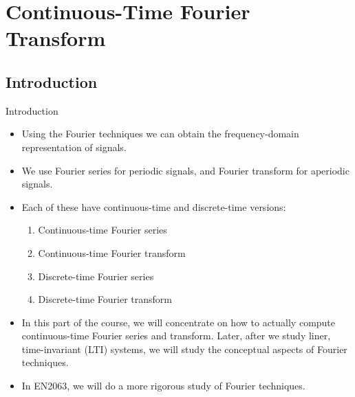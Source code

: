 \section{Continuous-Time Fourier Transform}

\subsection{Introduction}
\begin{frame}{Introduction}
    \begin{itemize}[<+->]
      \item Using the Fourier techniques we can obtain the frequency-domain representation of signals.
      \item We use Fourier series for periodic signals, and Fourier transform for aperiodic signals.
      \item Each of these have continuous-time and discrete-time versions:
        \begin{enumerate}
            \item Continuous-time Fourier series
            \item Continuous-time Fourier transform
            \item Discrete-time Fourier series
            \item Discrete-time Fourier transform
        \end{enumerate}
      \item In this part of the course, we will concentrate on how to actually compute continuous-time Fourier series and transform. Later, after we study liner, time-invariant (LTI) systems, we will study the conceptual aspects of Fourier techniques.
      \item In EN2063, we will do a more rigorous study of Fourier techniques.
    \end{itemize}
\end{frame}

